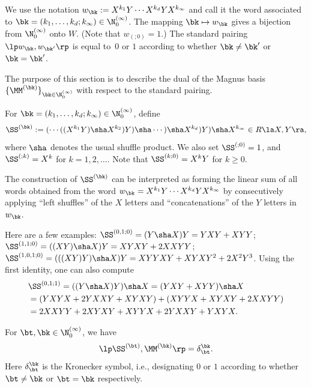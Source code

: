 \begin{Notation} We use the notation $w_\bk:=X^{k_1}Y\cdots X^{k_d}YX^{k_\infty}$
and call it the word associated to $\bk=(k_1,\dots,k_d; k_\infty)\in\N_0^{(\infty)}$.
The mapping $\bk\mapsto w_\bk$ gives a bijection from $\N_0^{(\infty)}$ onto $W$.
(Note that $w_{(;0)}=1$.)
The standard pairing $\lp w_\bk,w_{\bk'}\rp$ is equal to~$0$ or $1$ 
according to whether $\bk\ne \bk'$ or $\bk=\bk'$.
\end{Notation}


The purpose of this section is to describe the dual of the 
Magnus basis
$\{\MM^{(\bk)}\}_{\bk\in \N_0^{(\infty)}}$ with respect to the standard
pairing.

 
\begin{Definition}
\label{demi-shuffle}
For $\bk=(k_1,\dots,k_d; k_\infty)\in\N_0^{(\infty)}$, define
$$
\SS^{(\bk)}:=
(\cdots((X^{k_1}Y)\sha X^{k_2})Y)\sha\cdots)\sha  X^{k_d})Y)\sha
X^{k_\infty} \in R\la X,Y\ra,
$$
where $\sha$ denotes the usual shuffle product. 
We also set $\SS^{(;0)}=1$, and $\SS^{(;k)}=X^k$ for $k=1,2,\dots$.
Note that $\SS^{(k;0)}=X^kY$ for $k\ge 0$.
\end{Definition}

The construction of $\SS^{(\bk)}$ can be interpreted 
as forming the linear sum
of all words obtained from 
the word
$w_\bk=X^{k_1}Y\cdots X^{k_d}YX^{k_\infty}$
by consecutively applying ``left shuffles'' of the $X$ letters
and ``concatenations'' of the $Y$ letters in $w_\bk$.

\begin{Example}
Here are a few examples:
$\SS^{(0,1;0)}=(Y\sha X)Y=YXY+XYY$;
$\SS^{(1,1;0)}=((XY)\sha X)Y=XYXY+2XXYY$;
$\SS^{(1,0,1;0)}=(((XY)Y)\sha X)Y=XYYXY+XYXY^2+2X^2Y^3$.
Using the first identity, one can also compute
\begin{align*}
&\SS^{(0,1;1)}=((Y\sha X)Y)\sha X=(YXY+XYY)\sha X \\
&=(YXYX+2YXXY+XYXY)+(XYYX+XYXY+2XXYY) \\
&=2XXYY+2XYXY+XYYX+2YXXY+YXYX.
\end{align*}
\end{Example}

\begin{Theorem}[Duality] \label{orthogonality}
For $\bt, \bk\in \N_0^{(\infty)}$, we have
$$
\lp \SS^{(\bt)},\MM^{(\bk)}\rp=\delta_\bt^{\bk}.
$$
Here $\delta_\bt^{\bk}$ is the Kronecker symbol, i.e., designating $0$ or $1$
according to whether $\bt\ne\bk$ or $\bt=\bk$ respectively.
\end{Theorem}


